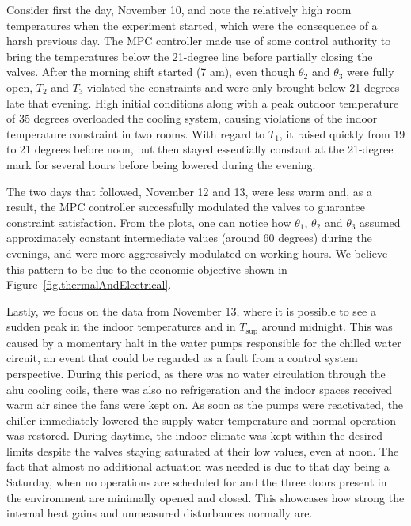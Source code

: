 Consider first the day, November 10, and note the relatively high room temperatures when the experiment started, which were the consequence of a harsh previous day. The MPC controller made use of some control authority to bring the temperatures below the 21-degree line before partially closing the valves. After the morning shift started (7 am), even though $\theta_2$ and $\theta_3$ were fully open, $T_2$ and $T_3$ violated the constraints and were only brought below 21 degrees late that evening. High initial conditions along with a peak outdoor temperature of 35 degrees overloaded the cooling system, causing violations of the indoor temperature constraint in two rooms. With regard to $T_1$, it raised quickly from 19 to 21 degrees before noon, but then stayed essentially constant at the 21-degree mark for several hours before being lowered during the evening.

The two days that followed, November 12 and 13, were less warm and, as a result, the MPC controller successfully modulated the valves to guarantee constraint satisfaction. From the plots, one can notice how $\theta_1$, $\theta_2$ and $\theta_3$ assumed  approximately constant intermediate values (around 60 degrees) during the evenings, and were more aggressively modulated on working hours. We believe this pattern to be due to the economic objective shown in Figure~\ref{fig.thermalAndElectrical}.

Lastly, we focus on the data from November 13, where it is possible to see a sudden peak in the indoor temperatures and in $T_{\text{sup}}$ around midnight. This was caused by a momentary halt in the water pumps responsible for the chilled water circuit, an event that could be regarded as a fault from a control system perspective. During this period, as there was no water circulation through the \ac{ahu} cooling coils, there was also no refrigeration and the indoor spaces received warm air since the fans were kept on. As soon as the pumps were reactivated, the chiller immediately lowered the supply water temperature and normal operation was restored. During daytime, the indoor climate was kept within the desired limits despite the valves staying saturated at their low values, even at noon. The fact that almost no additional actuation was needed is due to that day being a Saturday, when no operations are scheduled for and the three doors present in the environment are minimally opened and closed. This showcases how strong the internal heat gains and unmeasured disturbances normally are.

